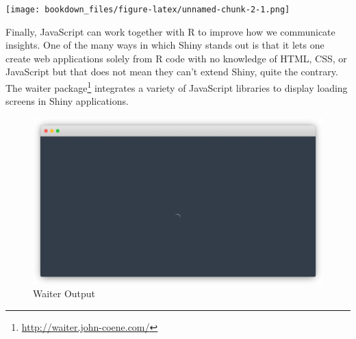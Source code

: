 \documentclass[
]{krantz}
\makeatletter
\newenvironment{Shaded}{\begin{snugshade}}{\end{snugshade}}
\newcommand{\CommentTok}[1]{\textcolor[rgb]{0.37,0.37,0.37}{\textit{#1}}}
\newcommand{\ControlFlowTok}[1]{\textcolor[rgb]{0.27,0.27,0.27}{\textbf{#1}}}
\newcommand{\DecValTok}[1]{\textcolor[rgb]{0.06,0.06,0.06}{#1}}
\newcommand{\KeywordTok}[1]{\textcolor[rgb]{0.27,0.27,0.27}{\textbf{#1}}}
\newcommand{\NormalTok}[1]{#1}
\newcommand{\OperatorTok}[1]{\textcolor[rgb]{0.43,0.43,0.43}{\textbf{#1}}}
\newcommand{\StringTok}[1]{\textcolor[rgb]{0.5,0.5,0.5}{#1}}
\renewcommand{\href}[2]{#2\footnote{\url{#1}}}
\newenvironment{kframe}{%
\medskip{}
\setlength{\fboxsep}{.8em}
 \def\at@end@of@kframe{}%
 \ifinner\ifhmode%
  \def\at@end@of@kframe{\end{minipage}}%
  \begin{minipage}{\columnwidth}%
 \fi\fi%
 \def\FrameCommand##1{\hskip\@totalleftmargin \hskip-\fboxsep
 \colorbox{shadecolor}{##1}\hskip-\fboxsep
     \hskip-\linewidth \hskip-\@totalleftmargin \hskip\columnwidth}%
 \MakeFramed {\advance\hsize-\width
   \@totalleftmargin\z@ \linewidth\hsize
   \@setminipage}}%
 {\par\unskip\endMakeFramed%
 \at@end@of@kframe}
\renewenvironment{Shaded}{\begin{kframe}}{\end{kframe}}
\makeatother
\begin{document}
\texttt{[image: bookdown\_files/figure-latex/unnamed-chunk-2-1.png]}

Finally, JavaScript can work together with R to improve how we communicate insights. One of the many ways in which Shiny stands out is that it lets one create web applications solely from R code with no knowledge of HTML, CSS, or JavaScript but that does not mean they can't extend Shiny, quite the contrary. The \href{http://waiter.john-coene.com/}{waiter package} \citep{R-waiter} integrates a variety of JavaScript libraries to display loading screens in Shiny applications.

\begin{Shaded}
\end{Shaded}

\begin{figure}
\centering
\includegraphics{images/waiter.png}
\caption{Waiter Output}
\end{figure}
\end{document}

